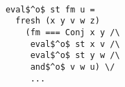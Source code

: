 

\begin{figure}[!t]
  \centering
  \begin{minipage}{0.49\textwidth}
    \begin{lstlisting}
    
            eval$^o$ st fm u = 
              fresh (x y v w z) 
                (fm === Conj x y /\
                 eval$^o$ st x v /\
                 eval$^o$ st y w /\
                 and$^o$ v w u) \/
                 ... 
    \end{lstlisting}
  \end{minipage}
\end{figure}




